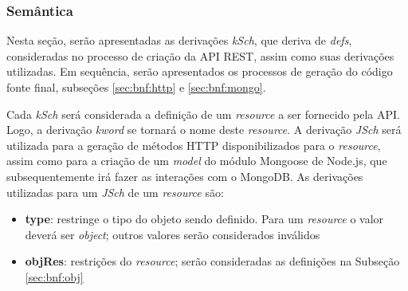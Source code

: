 \subsubsection{Semântica}

Nesta seção, serão apresentadas as derivações \textit{kSch}, que deriva de \textit{defs}, consideradas no processo de criação da API REST, assim como suas derivações utilizadas. Em sequência, serão apresentados os processos de geração do código fonte final, subseções \ref{sec:bnf:http} e \ref{sec:bnf:mongo}.



\label{sec:bnf:ksch}

Cada \textit{kSch} será considerada a definição de um \textit{resource} a ser fornecido pela API. Logo, a derivação \textit{kword} se tornará o nome deste \textit{resource}. A derivação \textit{JSch} será utilizada para a geração de métodos HTTP disponibilizados para o \textit{resource}, assim como para a criação de um \textit{model} do módulo Mongoose de Node.js, que subsequentemente irá fazer as interações com o MongoDB. As derivações utilizadas para um \textit{JSch} de um \textit{resource} são:
\begin{itemize}


    \item \textbf{type}: restringe o tipo do objeto sendo definido. Para um \textit{resource} o valor deverá ser \textit{object}; outros valores serão considerados inválidos

    \item \textbf{objRes}: restrições do \textit{resource}; serão consideradas as definições na Subseção \ref{sec:bnf:obj}
\end{itemize}

